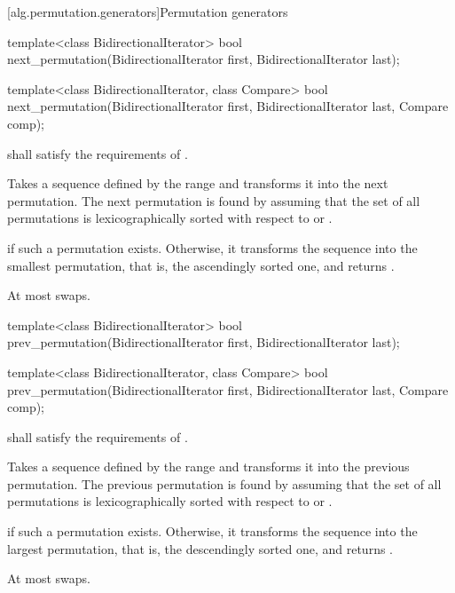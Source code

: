 [alg.permutation.generators]{Permutation generators}

%
\begin{itemdecl}
template<class BidirectionalIterator>
  bool next_permutation(BidirectionalIterator first,
                        BidirectionalIterator last);

template<class BidirectionalIterator, class Compare>
  bool next_permutation(BidirectionalIterator first,
                        BidirectionalIterator last, Compare comp);
\end{itemdecl}

\begin{itemdescr}
\pnum
\requires
{} shall satisfy the requirements of
.

\pnum
\effects
Takes a sequence defined by the range
and transforms it into the next permutation.
The next permutation is found by assuming that the set of all permutations is
lexicographically sorted with respect to
or .

\pnum
\returns
{}
if such a permutation exists.
Otherwise, it transforms the sequence into the smallest permutation,
that is, the ascendingly sorted one, and returns
.

\pnum
\complexity
At most
swaps.
\end{itemdescr}

%
\begin{itemdecl}
template<class BidirectionalIterator>
  bool prev_permutation(BidirectionalIterator first,
                        BidirectionalIterator last);

template<class BidirectionalIterator, class Compare>
  bool prev_permutation(BidirectionalIterator first,
                        BidirectionalIterator last, Compare comp);
\end{itemdecl}

\begin{itemdescr}
\pnum
\requires
{} shall satisfy the requirements of
.

\pnum
\effects
Takes a sequence defined by the range
and transforms it into the previous permutation.
The previous permutation is found by assuming that the set of all permutations is
lexicographically sorted with respect to
or .

\pnum
\returns
{}
if such a permutation exists.
Otherwise, it transforms the sequence into the largest permutation,
that is, the descendingly sorted one, and returns
.

\pnum
\complexity
At most
swaps.
\end{itemdescr}

